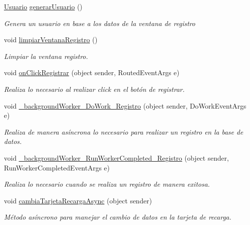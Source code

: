 \begin{DoxyCompactItemize}
\hyperlink{class_proyecto___integrador__3_1_1_tipos_dato_1_1_usuario}{Usuario} \hyperlink{class_proyecto___integrador__3_1_1_main_window_ab40c61d0760b2a0dc07afd9fb565783e}{generar\-Usuario} ()
\begin{DoxyCompactList}\small\item\em Genera un usuario en base a los datos de la ventana de registro \end{DoxyCompactList}\item 
void \hyperlink{class_proyecto___integrador__3_1_1_main_window_a1d010d4a4b67fd7ffd813ca7112a36c0}{limpiar\-Ventana\-Registro} ()
\begin{DoxyCompactList}\small\item\em Limpiar la ventana registro. \end{DoxyCompactList}\item 
void \hyperlink{class_proyecto___integrador__3_1_1_main_window_a39bbc99ea9b8992b13d0fca168a7c114}{on\-Click\-Registrar} (object sender, Routed\-Event\-Args e)
\begin{DoxyCompactList}\small\item\em Realiza lo necesario al realizar click en el botón de registrar. \end{DoxyCompactList}\item 
void \hyperlink{class_proyecto___integrador__3_1_1_main_window_aae749b1f7feed30900718b882825b55b}{\-\_\-background\-Worker\-\_\-\-Do\-Work\-\_\-\-Registro} (object sender, Do\-Work\-Event\-Args e)
\begin{DoxyCompactList}\small\item\em Realiza de manera asíncrona lo necesario para realizar un registro en la base de datos. \end{DoxyCompactList}\item 
void \hyperlink{class_proyecto___integrador__3_1_1_main_window_a4fe8d1cf799e1d4280c5abcc9eb9d356}{\-\_\-background\-Worker\-\_\-\-Run\-Worker\-Completed\-\_\-\-Registro} (object sender, Run\-Worker\-Completed\-Event\-Args e)
\begin{DoxyCompactList}\small\item\em Realiza lo necesario cuando se realiza un registro de manera exitosa. \end{DoxyCompactList}\item 
void \hyperlink{class_proyecto___integrador__3_1_1_main_window_a13c290aea55aad3e4de241ed928a4dfc}{cambia\-Tarjeta\-Recarga\-Async} (object sender)
\begin{DoxyCompactList}\small\item\em Método asíncrono para manejar el cambio de datos en la tarjeta de recarga. \end{DoxyCompactList}\item 

\end{DoxyCompactItemize}
